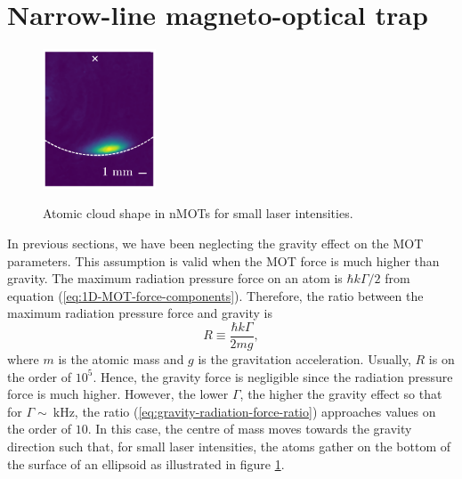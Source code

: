 %
\newpage
\section{Narrow-line magneto-optical trap}
\label{sec:narrow-line-MOT}
%

\begin{figure}
    \centering
    \vspace{-10px}
    \caption{Atomic cloud shape in nMOTs for small laser intensities.}
    \includegraphics[width=0.3\textwidth]{USPSC-img/atomic_cloud_shape_in_nMOTs.png}
    \label{fig:atomic-cloud-shape-nMOTs}
    \vspace{-10px}
\end{figure}

In previous sections, we have been neglecting the gravity effect on the MOT parameters. This assumption is valid when the MOT force is much higher than gravity. The maximum radiation pressure force on an atom is $ \hbar k \Gamma / 2 $ from equation (\ref{eq:1D-MOT-force-components}). Therefore, the ratio between the maximum radiation pressure force and gravity is
\begin{equation}
    R \equiv \frac{\hbar k \Gamma}{2 m g},
    \label{eq:gravity-radiation-force-ratio}
\end{equation}
where $ m $ is the atomic mass and $ g $ is the gravitation acceleration. Usually, $ R $ is on the order of $ 10^5 $. Hence, the gravity force is negligible since the radiation pressure force is much higher. However, the lower $ \Gamma $, the higher the gravity effect so that for $ \Gamma \sim\ \textrm{kHz} $, the ratio (\ref{eq:gravity-radiation-force-ratio}) approaches values on the order of $ 10 $. In this case, the centre of mass moves towards the gravity direction such that, for small laser intensities, the atoms gather on the bottom of the surface of an ellipsoid as illustrated in figure \ref{fig:atomic-cloud-shape-nMOTs}.

